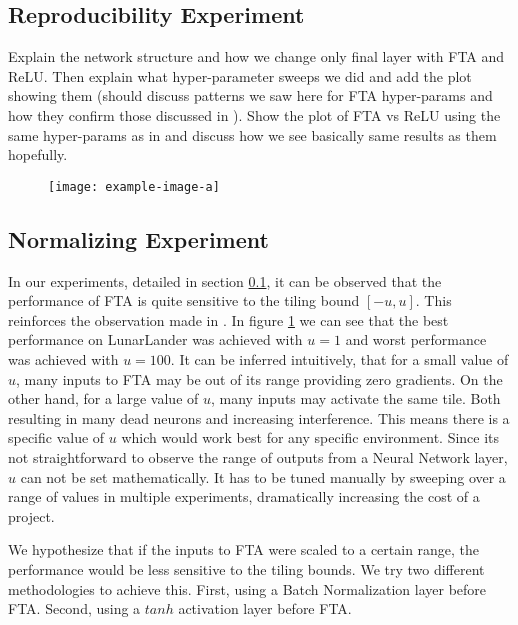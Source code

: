 \documentclass{article}
\begin{document}
\subsection{Reproducibility Experiment} \label{sub-sec:reproduc experiments}
Explain the network structure and how we change only final layer with FTA and ReLU.
Then explain what hyper-parameter sweeps we did and add the plot showing them (should discuss patterns we saw here for FTA hyper-params and how they confirm those discussed in \cite[]{pan2019fuzzy}).
Show the plot of FTA vs ReLU using the same hyper-params as in \cite[]{pan2019fuzzy} and discuss how we see basically same results as them hopefully.

\begin{figure}[h]
    \centering
    \texttt{[image: example-image-a]}
    \caption{}
    \label{fig:fta param sweep}
\end{figure}


\subsection{Normalizing Experiment} \label{sub-sec:normalize experiments}
In our experiments, detailed in section \ref{sub-sec:reproduc experiments}, it can be observed that the performance of FTA is quite sensitive to the tiling bound $[-u, u]$. 
This reinforces the observation made in \cite{pan2019fuzzy}. 
In figure \ref{fig:fta param sweep} we can see that the best performance on LunarLander was achieved with $u=1$ and worst performance was achieved with $u=100$. 
It can be inferred intuitively, that for a small value of $u$, many inputs to FTA may be out of its range providing zero gradients. 
On the other hand, for a large value of $u$, many inputs may activate the same tile. 
Both resulting in many dead neurons and increasing interference. 
This means there is a specific value of $u$ which would work best for any specific environment. 
Since its not straightforward to observe the range of outputs from a Neural Network layer, $u$ can not be set mathematically. 
It has to be tuned manually by sweeping over a range of values in multiple experiments, dramatically increasing the cost of a project.

We hypothesize that if the inputs to FTA were scaled to a certain range, the performance would be less sensitive to the tiling bounds. 
We try two different methodologies to achieve this. 
First, using a Batch Normalization \cite[]{ioffe2015batch} layer before FTA. 
Second, using a $tanh$ activation layer before FTA. 
\end{document}
